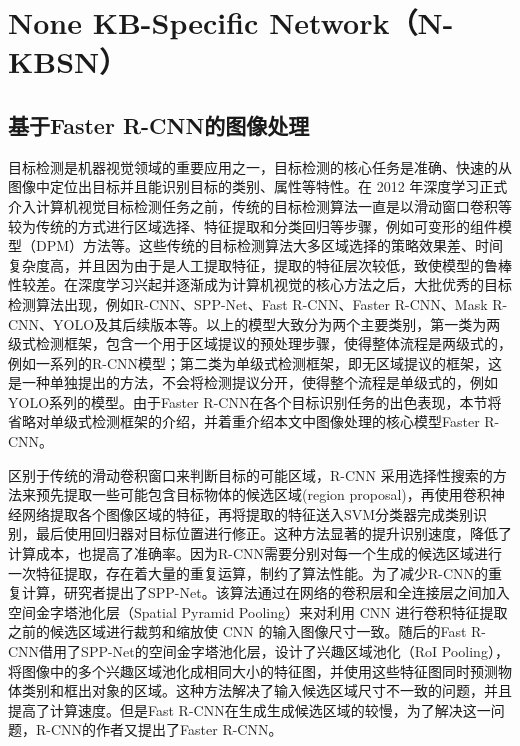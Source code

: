 
\chapter{None KB-Specific Network（N-KBSN）}

\section{基于Faster R-CNN的图像处理}
目标检测是机器视觉领域的重要应用之一，目标检测的核心任务是准确、快速的从图像中定位出目标并且能识别目标的类别、属性等特性。在 2012 年深度学习正式介入计算机视觉目标检测任务之前，传统的目标检测算法一直是以滑动窗口卷积等较为传统的方式进行区域选择、特征提取和分类回归等步骤，例如可变形的组件模型（DPM）方法等。这些传统的目标检测算法大多区域选择的策略效果差、时间复杂度高，并且因为由于是人工提取特征，提取的特征层次较低，致使模型的鲁棒性较差。在深度学习兴起并逐渐成为计算机视觉的核心方法之后，大批优秀的目标检测算法出现，例如R-CNN、SPP-Net、Fast R-CNN、Faster R-CNN、Mask R-CNN、YOLO及其后续版本等。以上的模型大致分为两个主要类别，第一类为两级式检测框架，包含一个用于区域提议的预处理步骤，使得整体流程是两级式的，例如一系列的R-CNN模型；第二类为单级式检测框架，即无区域提议的框架，这是一种单独提出的方法，不会将检测提议分开，使得整个流程是单级式的，例如YOLO系列的模型。由于Faster R-CNN在各个目标识别任务的出色表现，本节将省略对单级式检测框架的介绍，并着重介绍本文中图像处理的核心模型Faster R-CNN。

区别于传统的滑动卷积窗口来判断目标的可能区域，R-CNN 采用选择性搜索的方法来预先提取一些可能包含目标物体的候选区域(region proposal)，再使用卷积神经网络提取各个图像区域的特征，再将提取的特征送入SVM分类器完成类别识别，最后使用回归器对目标位置进行修正。这种方法显著的提升识别速度，降低了计算成本，也提高了准确率。因为R-CNN需要分别对每一个生成的候选区域进行一次特征提取，存在着大量的重复运算，制约了算法性能。为了减少R-CNN的重复计算，研究者提出了SPP-Net。该算法通过在网络的卷积层和全连接层之间加入空间金字塔池化层（Spatial Pyramid Pooling）来对利用 CNN 进行卷积特征提取之前的候选区域进行裁剪和缩放使 CNN 的输入图像尺寸一致。随后的Fast R-CNN借用了SPP-Net的空间金字塔池化层，设计了兴趣区域池化（RoI Pooling），将图像中的多个兴趣区域池化成相同大小的特征图，并使用这些特征图同时预测物体类别和框出对象的区域。这种方法解决了输入候选区域尺寸不一致的问题，并且提高了计算速度。但是Fast R-CNN在生成生成候选区域的较慢，为了解决这一问题，R-CNN的作者又提出了Faster R-CNN。

